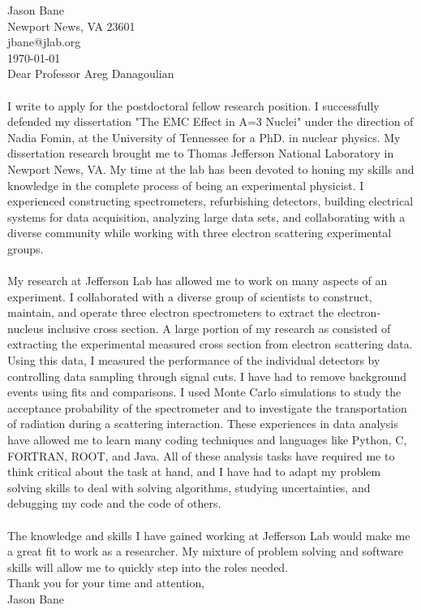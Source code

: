 \documentclass[12pt,letterpaper]{article}
\newcommand{\CPP}
{C\nolinebreak[4]\hspace{-.05em}\raisebox{.22ex}{\footnotesize\bf ++}}
\begin{document}
\vspace*{-1.2cm}
\noindent Jason Bane\\
Newport News, VA 23601 \\
jbane@jlab.org \\

\noindent\today\\

Dear Professor Areg Danagoulian\\


\paragraph{}I write to apply for the postdoctoral fellow research position. I successfully defended my dissertation "The EMC Effect in A=3 Nuclei" under the direction of Nadia Fomin, at the University of Tennessee for a PhD. in nuclear physics. My dissertation research brought me to Thomas Jefferson National Laboratory in Newport News, VA. My time at the lab has been devoted to honing my skills and knowledge in the complete process of being an experimental physicist. I experienced constructing spectrometers, refurbishing detectors, building electrical systems for data acquisition, analyzing large data sets, and collaborating with a diverse community while working with three electron scattering experimental groups.

\paragraph{}My research at Jefferson Lab has allowed me to work on many aspects of an experiment. I collaborated with a diverse group of scientists to construct, maintain, and operate three electron spectrometers to extract the electron-nucleus inclusive cross section. A large portion of my research as consisted of extracting the experimental measured cross section from electron scattering data. Using this data, I measured the performance of the individual detectors by controlling data sampling through signal cuts. I have had to remove background events using fits and comparisons. I used Monte Carlo simulations to study the acceptance probability of the spectrometer and to investigate the transportation of radiation during a scattering interaction. These experiences in data analysis have allowed me to learn many coding techniques and languages like Python, \CPP, FORTRAN, ROOT, and Java. All of these analysis tasks have required me to think critical about the task at hand, and I have had to adapt my problem solving skills to deal with solving algorithms, studying uncertainties, and debugging my code and the code of others. 

\paragraph{}The knowledge and skills I have gained working at Jefferson Lab would make me a great fit to work as a researcher. My mixture of problem solving and software skills will allow me to quickly step into the roles needed. 
\\

\noindent Thank you for your time and attention,\\
\noindent Jason Bane
\end{document}
